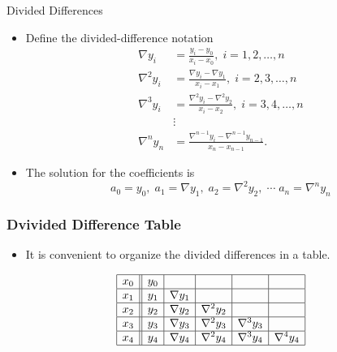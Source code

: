 \documentclass{beamer}
\begin{document}
\begin{frame}{Divided Differences}
\begin{itemize}
\item Define the divided-difference notation 
\begin{align*}
\nabla y_i&=\frac{y_i-y_0}{x_i-x_0}, \; i=1,2,\ldots, n\\
\nabla^2 y_i&=\frac{\nabla y_i-\nabla y_1}{x_i-x_1}, \; i=2,3,\ldots, n\\
\nabla^3 y_i&=\frac{\nabla^2 y_i-\nabla^2 y_2}{x_i-x_2}, \; i=3,4,\ldots, n\\
& \vdots\\
\nabla^n y_n&=\frac{\nabla^{n-1} y_i-\nabla^{n-1} y_{n-1}}{x_n-x_{n-1}}.
\end{align*}
\item The solution for the coefficients is 
\[
a_0=y_0,\; a_1=\nabla y_1, \; a_2=\nabla^2 y_2, \;\cdots\; a_n=\nabla^n y_n
\]
\end{itemize}
\end{frame}

\begin{frame}
  \frametitle{Dvivided Difference Table}
  \begin{itemize}
    \item It is convenient to organize the divided differences in a table.
  \end{itemize}
  \[
  \begin{array}{|c||c|c|c|c|c|}
    \hline x_0 & y_0 & & & & \\
    \hline x_1 & y_1 & \nabla y_1 & & & \\
    \hline x_2 & y_2 & \nabla y_2 & \nabla^2 y_2 & & \\
    \hline x_3 & y_3 & \nabla y_3 & \nabla^2 y_3 & \nabla^3 y_3 & \\
    \hline x_4 & y_4 & \nabla y_4 & \nabla^2 y_4 & \nabla^3 y_4 & \nabla^4 y_4 \\
    \hline
  \end{array}
  \]
  
\end{frame}

\end{document}
